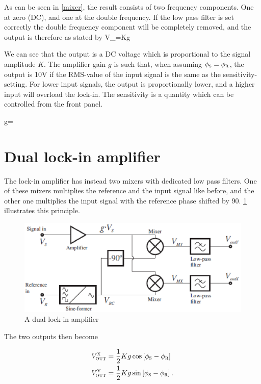 As can be seen in \cref{mixer}, the result consists of two frequency components. One at zero (DC), and one at the double frequency. If the low pass filter is set correctly the double frequency component will be completely removed, and the output is therefore as stated by
\mate
V_{}=Kg\cos{}
\atem

We can see that the output is a DC voltage which is proportional to the signal amplitude $K$. The amplifier gain $g$ is such that, when assuming  $\phi_{\mbox{\footnotesize{\scshape{s}}}}=\phi_{\mbox{\footnotesize{\scshape{r}}}}$, the output is 10V if the RMS-value of the input signal is the same as the sensitivity-setting. For lower input signals, the output is proportionally lower, and a higher input will overload the lock-in. The sensitivity is a quantity which can be controlled from the front panel.

\mate
g=
\atem

	\section{Dual lock-in amplifier}
The lock-in amplifier has instead two mixers with dedicated low pass filters. One of these mixers multiplies the reference and the input signal like before, and the other one multiplies the input signal with the reference phase shifted by 90\textdegree. \cref{lockin2} illustrates this principle.

\begin{figure}[!hbt]\centering
\includegraphics[width=\linewidth, draft=\foto]{eps/lockin2.eps}
\caption{A dual lock-in amplifier}
\label{lockin2}
\end{figure}

The two outputs then become

\begin{align}
V_{\mbox{\footnotesize{\scshape{out}}}}^{\mbox{\footnotesize{\scshape{x}}}}&=\frac{1}{2}Kg\cos\left[\phi_{\mbox{\footnotesize{\scshape{s}}}}-\phi_{\mbox{\footnotesize{\scshape{r}}}}\right]
\\
V_{\mbox{\footnotesize{\scshape{out}}}}^{\mbox{\footnotesize{\scshape{y}}}}&=\frac{1}{2}Kg\sin\left[\phi_{\mbox{\footnotesize{\scshape{s}}}}-\phi_{\mbox{\footnotesize{\scshape{r}}}}\right].
\end{align}


